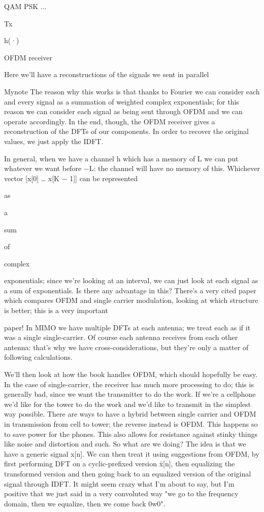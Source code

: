 {QAM PSK
...

Tx

h(·)

OFDM receiver

Here we'll have a reconstructions of the signals we sent in parallel

​Mynote The reason why this works is that thanks to Fourier we can consider each and every signal as a summation of weighted complex exponentials; for this reason we can consider each signal as being sent through OFDM and we can operate accordingly. In the end, though, the OFDM receiver gives a reconstruction of the DFTs of our components.
In order to recover the original values, we just apply the IDFT.

In general, when we have a channel h which has a memory of L we can put whatever we want before −L: the channel will have no memory of this.
Whichever vector [x[0] … x[K − 1]] can be represented

as

a

sum

of

complex

exponentials; since we're looking at an interval, we can just look at each signal as a sum of exponentials.
Is there any advantage in this? There's a very cited paper which compares OFDM and single carrier modulation, looking at which structure is better; this is a very important

paper!
In MIMO we have multiple DFTs at each antenna; we treat each as if it was a single single-carrier. Of course each antenna receives from each other antenna: that's why we have cross-considerations, but they're only a matter of following calculations.

We'll then look at how the book handles OFDM, which should hopefully be easy. In the case of single-carrier, the receiver has much more processing to do; this is generally bad, since we want the transmitter to do the work.
If we're a cellphone we'd like for the tower to do the work and we'd like to transmit in the simplest way possible.
There are ways to have a hybrid between single carrier and OFDM in transmission from cell to tower; the reverse instead is OFDM.
This happens so to save power for the phones.
This also allows for resistance against stinky things like noise and distortion and such.
​So what are we doing?
The idea is that we have a generic signal x[n]. We can then treat it using suggestions from OFDM, by first performing DFT on a cyclic-prefixed version x̄[n], then equalizing the transformed version and then going back to an equalized version of the original signal through IDFT.
It might seem crazy what I'm about to say, but I'm positive that we just said in a very convoluted way "we go to the frequency domain, then we equalize, then we come back 0w0".

}
